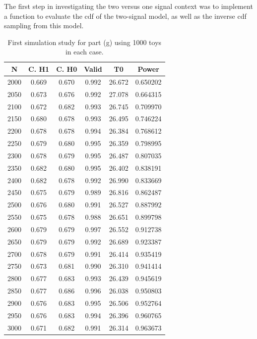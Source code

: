 \documentclass[12pt]{article}
\begin{document}
The first step in investigating the two versus one signal context was to implement a function to evaluate the cdf of the two-signal model, as well as the inverse cdf sampling from this model.

\begin{table}
  \centering
  \begin{tabular}{| c | c | c | c | c | c |}
      \hline
         N & C. H1 & C. H0 & Valid & T0     & Power    \\
      \hline
      2000 & 0.669 & 0.670 & 0.992 & 26.672 & 0.650202 \\
      \hline
      2050 & 0.673 & 0.676 & 0.992 & 27.078 & 0.664315 \\
      \hline
      2100 & 0.672 & 0.682 & 0.993 & 26.745 & 0.709970 \\
      \hline
      2150 & 0.680 & 0.678 & 0.993 & 26.495 & 0.746224 \\
      \hline
      2200 & 0.678 & 0.678 & 0.994 & 26.384 & 0.768612 \\
      \hline
      2250 & 0.679 & 0.680 & 0.995 & 26.359 & 0.798995 \\
      \hline
      2300 & 0.678 & 0.679 & 0.995 & 26.487 & 0.807035 \\
      \hline
      2350 & 0.682 & 0.680 & 0.995 & 26.402 & 0.838191 \\
      \hline
      2400 & 0.682 & 0.678 & 0.992 & 26.990 & 0.833669 \\
      \hline
      2450 & 0.675 & 0.679 & 0.989 & 26.816 & 0.862487 \\
      \hline
      2500 & 0.676 & 0.680 & 0.991 & 26.527 & 0.887992 \\
      \hline
      2550 & 0.675 & 0.678 & 0.988 & 26.651 & 0.899798 \\
      \hline
      2600 & 0.679 & 0.679 & 0.997 & 26.552 & 0.912738 \\
      \hline
      2650 & 0.679 & 0.679 & 0.992 & 26.689 & 0.923387 \\
      \hline
      2700 & 0.678 & 0.679 & 0.991 & 26.414 & 0.935419 \\
      \hline
      2750 & 0.673 & 0.681 & 0.990 & 26.310 & 0.941414 \\
      \hline
      2800 & 0.677 & 0.683 & 0.993 & 26.439 & 0.945619 \\
      \hline
      2850 & 0.677 & 0.686 & 0.996 & 26.038 & 0.950803 \\
      \hline
      2900 & 0.676 & 0.683 & 0.995 & 26.506 & 0.952764 \\
      \hline
      2950 & 0.676 & 0.683 & 0.994 & 26.396 & 0.960765 \\
      \hline
      3000 & 0.671 & 0.682 & 0.991 & 26.314 & 0.963673 \\
      \hline
  \end{tabular}
\caption{First simulation study for part (g) using 1000 toys in each case.}
\label{tab_g_1}
\end{table}
\end{document}
